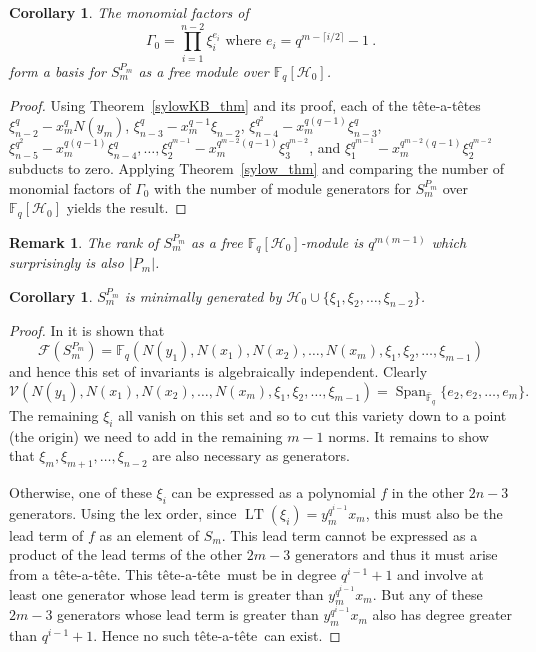 \documentclass{amsart}
\newcommand{\field}{\mathbb{F}}
\newcommand{\V}{\mathcal{V}}
\newcommand{\F}{\mathcal{F}}
\newcommand{\HH}{\mathcal{H}}
\newcommand{\tat}{t\^ete-a-t\^ete}
\newtheorem{cor}[subsection]{Corollary}
\newtheorem{remark}[subsection]{Remark}
\DeclareMathOperator{\Span}{Span}
\DeclareMathOperator{\lt}{LT}
\begin{document}
\begin{cor}\label{Sylow_basis}
    The monomial factors of 
$$\Gamma_0=\prod_{i=1}^{n-2} \xi_{i}^{e_i} \text{ where }
e_i = q^{m-\lceil i/2\rceil}-1\ .$$ 
 form a basis for 
    $S_m^{P_m}$ as a free module over $\field_q[\HH_0]$.
\end{cor}
\begin{proof}
  Using Theorem~\ref{sylowKB_thm} and its proof,
  each of the \tat s  $\xi_{n-2}^q - x_m^q N(y_m)$, 
  $\xi_{n-3}^q - x_m^{q-1}\xi_{n-2}$, 
  $\xi_{n-4}^{q^2} - x_m^{q(q-1)}\xi_{n-3}^q$,
  $\xi_{n-5}^{q^2} - x_m^{q(q-1)}\xi_{n-4}^q, \dots,
  \xi_2^{q^{m-1}}-x_m^{q^{m-2}(q-1)}\xi_3^{q^{m-2}}$, and
  $\xi_1^{q^{m-1}}-x_m^{q^{m-2}(q-1)}\xi_2^{q^{m-2}}$
  subducts to zero.   Applying Theorem~\ref{sylow_thm}
  and comparing the number of monomial factors of
  $\Gamma_0$ with the number of module generators for $S_m^{P_m}$
  over $\field_q[\HH_0]$ yields the result.
\end{proof}

\begin{remark}
    The rank of $S_m^{P_m}$ as a free $\field_q[\HH_0]$-module is $q^{m(m-1)}$ which surprisingly
is also $|P_m|$.
\end{remark}

\begin{cor}\label{Sylow minimality}
    $S_m^{P_m}$ is minimally generated by 
    $\HH_0 \cup \{\xi_1,\xi_2,\dots,\xi_{n-2}\}$.
\end{cor}

\begin{proof}
  In \cite{Ferreira+Fleischmann-fields:16} it is shown that 
$$\F(S_m^{P_m}) = \field_q(N(y_1),N(x_1),N(x_2),\dots,N(x_m),\xi_1,\xi_2,\dots,\xi_{m-1})$$
and hence this set of invariants is algebraically independent.
Clearly 
$$\V(N(y_1),N(x_1),N(x_2),\dots,N(x_m),\xi_1,\xi_2,\dots,\xi_{m-1}) = 
\Span_{\overline{\field}_q}\{e_2,e_2,\dots,e_{m}\}.$$
The remaining $\xi_{i}$ all vanish on this set and so to cut this variety down to a point
(the origin) we need to add in the remaining $m-1$ norms.  It remains to show that
$\xi_{m},\xi_{m+1},\dots,\xi_{n-2}$ are also necessary as generators.

  Otherwise, one of these $\xi_{i}$ can be expressed as a polynomial $f$ in the other $2n-3$
generators.  Using the lex order, since $\lt(\xi_{i})= y_m^{q^{i-1}}x_m$, this must also be the 
lead term of $f$ as 
an element of $S_m$.  This lead term cannot be expressed as a product of the lead terms
of the other $2m-3$ generators and thus it must arise from a \tat.  This \tat\ must
be in degree $q^{i-1}+1$ and involve at least one generator whose lead term is greater than $y_m^{q^{i-1}}x_m$.  But any of these
$2m-3$ generators whose lead term is greater than $y_m^{q^{i-1}}x_m$ also has degree
greater than $q^{i-1}+1$.  Hence no such \tat\ can exist.   
\end{proof}
\end{document}
